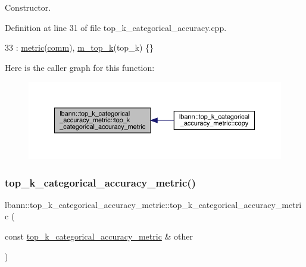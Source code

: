Constructor. 

Definition at line 31 of file top\+\_\+k\+\_\+categorical\+\_\+accuracy.\+cpp.


\begin{DoxyCode}
33   : \hyperlink{classlbann_1_1metric_a3cd2d4f7dcbf94f70b3b8560a3171d9d}{metric}(\hyperlink{file__io_8cpp_ab048c6f9fcbcfaa57ce68b00263dbebe}{comm}), \hyperlink{classlbann_1_1top__k__categorical__accuracy__metric_a6cc172f6799bffac44de06d0657efdeb}{m\_top\_k}(top\_k) \{\}
\end{DoxyCode}
Here is the caller graph for this function\+:\nopagebreak
\begin{figure}[H]
\begin{center}
\leavevmode
\includegraphics[width=350pt]{classlbann_1_1top__k__categorical__accuracy__metric_a3896f230e2972c01b746fc808c51462e_icgraph}
\end{center}
\end{figure}
\mbox{\label{classlbann_1_1top__k__categorical__accuracy__metric_a3a79aaa2c235ba13b366eed78cabeaf1}} 
\subsubsection{\texorpdfstring{top\+\_\+k\+\_\+categorical\+\_\+accuracy\+\_\+metric()}{top\_k\_categorical\_accuracy\_metric()}\hspace{0.1cm}{\footnotesize\ttfamily [2/2]}}
{\footnotesize\ttfamily lbann\+::top\+\_\+k\+\_\+categorical\+\_\+accuracy\+\_\+metric\+::top\+\_\+k\+\_\+categorical\+\_\+accuracy\+\_\+metric (\begin{DoxyParamCaption}\item[{const \hyperlink{classlbann_1_1top__k__categorical__accuracy__metric}{top\+\_\+k\+\_\+categorical\+\_\+accuracy\+\_\+metric} \&}]{other }\end{DoxyParamCaption})\hspace{0.3cm}{\ttfamily [default]}}

